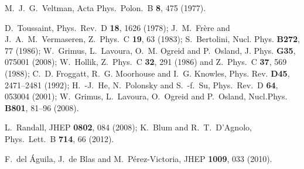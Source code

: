   M.~J.~G.~Veltman,
  Acta Phys.\ Polon.\ B {\bf 8}, 475 (1977).
  
  D.~Toussaint,
  Phys.\ Rev.\ D {\bf 18}, 1626 (1978);
  J.~M.~Fr\`ere and J.~A.~M.~Vermaseren,
  Z.\ Phys.\ C {\bf 19}, 63 (1983);
  S.~Bertolini,
  Nucl. Phys. \textbf{ B272}, 77 (1986);
  W.~Grimus, L.~Lavoura, O.~M. Ogreid and P.~Osland,
  J. Phys. \textbf{ G35}, 075001 (2008);
  W.~Hollik,
  Z.\ Phys.\ C {\bf 32}, 291 (1986) 
  and
  Z.\ Phys.\ C {\bf 37}, 569 (1988);
  C.~D. Froggatt, R.~G. Moorhouse and I.~G. Knowles,
  Phys. Rev. \textbf{ D45}, 2471--2481 (1992);
  H.~-J.~He, N.~Polonsky and S.~-f.~Su,
  Phys.\ Rev.\ D {\bf 64}, 053004 (2001);
  W.~Grimus, L.~Lavoura, O.~Ogreid and P.~Osland,
  Nucl.Phys. \textbf{ B801}, 81--96 (2008).

  L.~Randall,
  JHEP {\bf 0802}, 084 (2008);
  K.~Blum and R.~T.~D'Agnolo,
  Phys.\ Lett.\ B {\bf 714}, 66 (2012).
  
  F.~del \'Aguila, J.~de Blas and M.~P\'erez-Victoria,
  JHEP {\bf 1009}, 033 (2010).
